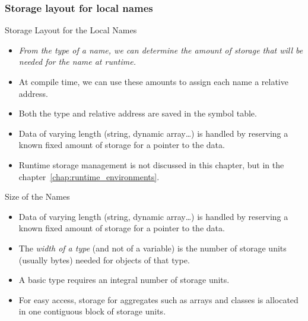 \begin{bibunit}[apalike]
\subsubsection{Storage layout for local names}

\tableofcontentslide[sections={3-6},sectionstyle={show/shaded},subsectionstyle={show/shaded/hide},subsubsectionstyle={show/shaded/hide/hide}]

\begin{frame}{Storage Layout for the Local Names}
	\begin{itemize}
	\item \emph{From the type of a name, we can determine the amount of storage that will be needed for the name at runtime.}
	\vfill
	\item At compile time, we can use these amounts to assign each name a relative address.
	\vfill
	\item Both the type and relative address are saved in the symbol table.
	\vfill
	\item Data of varying length (string, dynamic array\dots) is handled by reserving a known fixed amount of storage for a pointer to the data.
	\item Runtime storage management is not discussed in this chapter, but in the chapter~\ref{chap:runtime_environments}.
	\end{itemize}
\end{frame}

\begin{frame}{Size of the Names}
	\begin{itemize}
	\item Data of varying length (string, dynamic array\dots) is handled by reserving a known fixed amount of storage for a pointer to the data.
	\vfill
	\item The \emph{width of a type} (and not of a variable) is the number of storage units (usually bytes) needed for objects of that type.
	\vfill
	\item A basic type requires an integral number of storage units.
	\vfill
	\item For easy access, storage for aggregates such as arrays and classes is allocated in one contiguous block of storage units.
	\end{itemize}
\end{frame}


\end{bibunit}
